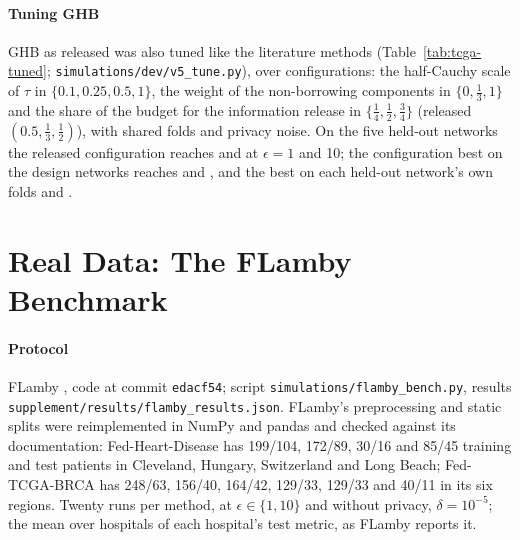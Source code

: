 \documentclass[acmsmall,screen,nonacm]{acmart}
\theoremstyle{acmdefinition}
\begin{document}
\paragraph{Tuning GHB} GHB as released was also tuned like the literature methods (Table~\ref{tab:tcga-tuned}; \texttt{simulations/dev/v5\_tune.py}), over \SimTuneConfigs{} configurations: the half-Cauchy scale of $\tau$ in $\{0.1,0.25,0.5,1\}$, the weight of the non-borrowing components in $\{0,\frac13,1\}$ and the share of the budget for the information release in $\{\frac14,\frac12,\frac34\}$ (released $(0.5,\frac13,\frac12)$), with shared folds and privacy noise. On the five held-out networks the released configuration reaches \SimTuneOneFixed{} and \SimTuneTenFixed{} at $\epsilon=1$ and 10; the configuration best on the design networks reaches \SimTuneOneDev{} and \SimTuneTenDev, and the best on each held-out network's own folds \SimTuneOneOrc{} and \SimTuneTenOrc.

\section{Real Data: The FLamby Benchmark}\label{sec:flamby}

\paragraph{Protocol} FLamby \cite{ogierduterrail2022flamby}, code at commit \texttt{edacf54}; script \texttt{simulations/\allowbreak flamby\_bench.py}, results \texttt{supplement/\allowbreak results/\allowbreak flamby\_results.json}. FLamby's preprocessing and static splits were reimplemented in NumPy and pandas and checked against its documentation: Fed-Heart-Disease has 199/104, 172/89, 30/16 and 85/45 training and test patients in Cleveland, Hungary, Switzerland and Long Beach; Fed-TCGA-BRCA has 248/63, 156/40, 164/42, 129/33, 129/33 and 40/11 in its six regions. Twenty runs per method, at $\epsilon\in\{1,10\}$ and without privacy, $\delta=10^{-5}$; the mean over hospitals of each hospital's test metric, as FLamby reports it.
\end{document}
